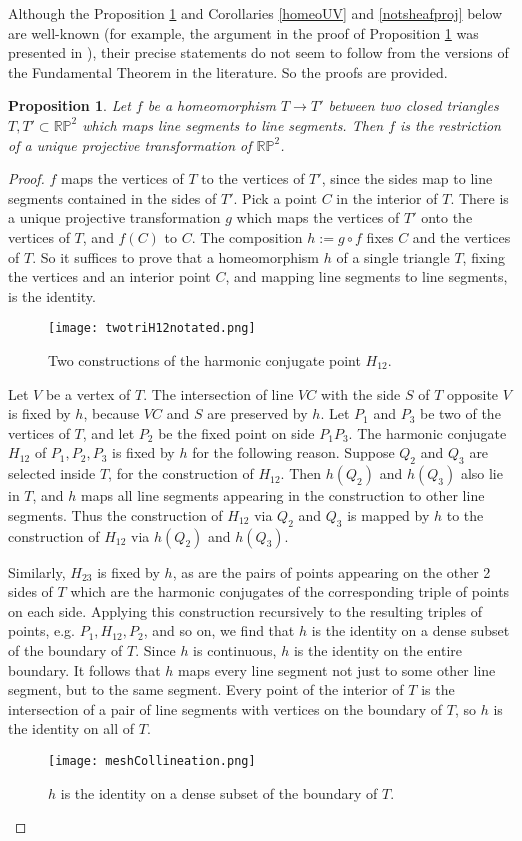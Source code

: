 \documentclass[12pt]{article}
\numberwithin{equation}{section}
\theoremstyle{plain}
\newtheorem{proposition}[definition]{Proposition}
\theoremstyle{definition}
\newcommand{\RP}{\mathbb{RP}}
\newcommand{\ra}{\rightarrow}
\begin{document}
Although the Proposition \ref{homeoTTp} and Corollaries \ref{homeoUV} and \ref{notsheafproj} below are well-known (for example, the argument in the proof of Proposition \ref{homeoTTp} was presented in \cite{eastwoodNord}), their precise statements do not seem to follow from the versions of the Fundamental Theorem in the literature. So the proofs are provided.
\begin{proposition}\label{homeoTTp} Let $f$ be a homeomorphism $T\ra T'$ between two closed triangles $T,T'\subset \RP^{2}$ which maps line segments to line segments. Then $f$ is the restriction of a unique projective transformation of $\RP^{2}$.
\end{proposition}
\begin{proof} $f$ maps the vertices of $T$ to the vertices of $T'$, since the sides map to line segments contained in the sides of $T'$. Pick a point $C$ in the interior of $T$. There is a unique projective transformation $g$ which maps the vertices of $T'$ onto the vertices of $T$, and $f(C)$ to $C$. The composition $h:=g\circ f$ fixes $C$ and the vertices of $T$. So it suffices to prove that a homeomorphism $h$ of a single triangle $T$, fixing the vertices and an interior point $C$, and mapping line segments to line segments, is the identity.
\begin{figure}[H]
 \centering
   \texttt{[image: twotriH12notated.png]}
   \caption{Two constructions of the harmonic conjugate point $H_{12}$.}
\end{figure}
Let $V$ be a vertex of $T$. The intersection of line $VC$ with the side $S$ of $T$ opposite $V$ is fixed by $h$, because $VC$ and $S$ are preserved by $h$. Let $P_1$ and $P_3$ be two of the vertices of $T$, and let $P_2$ be the fixed point on side $P_1P_3$. The harmonic conjugate $H_{12}$ of $P_1,P_2,P_3$ is fixed by $h$ for the following reason. Suppose $Q_2$ and $Q_3$ are selected inside $T$, for the construction of $H_{12}$. Then $h(Q_2)$ and $h(Q_3)$ also lie in $T$, and $h$ maps all line segments appearing in the construction to other line segments. Thus the construction of $H_{12}$ via $Q_{2}$ and $Q_{3}$ is mapped by $h$ to the construction of $H_{12}$ via $h(Q_{2})$ and $h(Q_{3})$.

Similarly, $H_{23}$ is fixed by $h$, as are the pairs of points appearing on the other 2 sides of $T$ which are the harmonic conjugates of the corresponding triple of points on each side. Applying this construction recursively to the resulting triples of points, e.g. $P_1, H_{12}, P_{2}$, and so on, we find that $h$ is the identity on a dense subset of the boundary of $T$. Since $h$ is continuous, $h$ is the identity on the entire boundary.  It follows that $h$ maps every line segment not just to some other line segment, but to the same segment. Every point of the interior of $T$ is the intersection of a pair of line segments with vertices on the boundary of $T$, so $h$ is the identity on all of $T$.
\begin{figure}[H]
 \centering
   \texttt{[image: meshCollineation.png]}
   \caption{$h$ is the identity on a dense subset of the boundary of $T$.}
\end{figure}
\end{proof}
\end{document}
